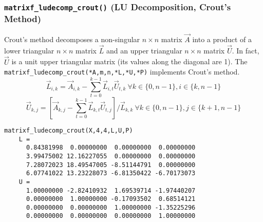 \subsubsection{{\tt matrixf\_ludecomp\_crout()} (LU Decomposition, Crout's Method)}
\label{module:matrix:ludecomp_crout}
Crout's method decomposes a non-singular $n\times n$ matrix $\vec{A}$
into a product of a lower triangular $n \times n$ matrix $\vec{L}$ and
an upper triangular $n \times n$ matrix $\vec{U}$. %
In fact, $\vec{U}$ is a unit upper triangular matrix (its values along
the diagonal are 1).
The {\tt matrixf\_ludecomp\_crout(*A,m,n,*L,*U,*P)} implements Crout's
method.
%
\[
    \vec{L}_{i,k} = \vec{A}_{i,k} -
                    \sum_{t=0}^{k-1}{ \vec{L}_{i,t} \vec{U}_{t,k} }
                    \ \forall k \in \{0,n-1\}, i \in \{k,n-1\}
\]
%
\[
    \vec{U}_{k,j} = \left[
                        \vec{A}_{k,j} -
                        \sum_{t=0}^{k-1}{ \vec{L}_{k,t} \vec{U}_{t,j} }
                    \right] / \vec{L}_{k,k}
                    \ \forall k \in \{0,n-1\}, j \in \{k+1,n-1\}
\]
%
\begin{Verbatim}[fontsize=\small]
    matrixf_ludecomp_crout(X,4,4,L,U,P)
    L =
      0.84381998  0.00000000  0.00000000  0.00000000
      3.99475002 12.16227055  0.00000000  0.00000000
      7.28072023 18.49547005 -8.51144791  0.00000000
      6.07741022 13.23228073 -6.81350422 -6.70173073
    U =
      1.00000000 -2.82410932  1.69539714 -1.97440207
      0.00000000  1.00000000 -0.17093502  0.68514121
      0.00000000  0.00000000  1.00000000 -1.35225296
      0.00000000  0.00000000  0.00000000  1.00000000
\end{Verbatim}

